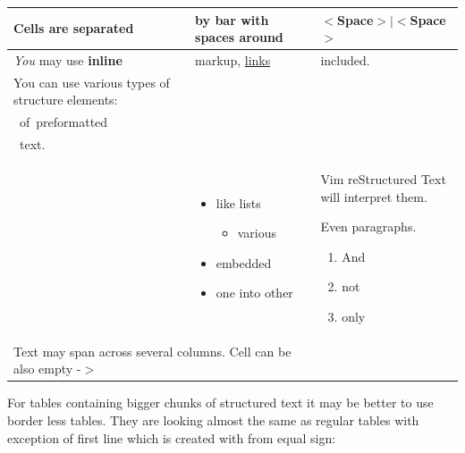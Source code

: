 \documentclass[12pt]{article}
\begin{document}
\setlongtables
\begin{center}
\begin{longtable}[c]{|p{}|p{}|p{}|}\hline

Cells are 
separated
&
by bar with 
spaces around
&
$<$Space$>$$|$$<$Space$>$
\\ \hline
\emph{You} may use 
\textbf{inline}
&
markup, 
\href{\#llinks}{links}
&
included.
\\ \hline
You can use various
types of structure 
elements:

\begin{ttfamily}\begin{flushleft}
\mbox{~Welcome~to~world~~}\\
\mbox{~of~preformatted~~~}\\
\mbox{~text.}\\
\end{flushleft}\end{ttfamily}
&
\begin{itemize}
\item
like lists

 \begin{itemize}
\item
various
\end{itemize}

\item
embedded

\item
one into 
other
\end{itemize}
&
Vim reStructured Text will 
interpret them.

Even paragraphs.

\begin{enumerate}[label=\arabic*.]
\item
And

\item
not

\item
only
\end{enumerate}

 \\ \hline
\multicolumn{2}{|p{0.60\textwidth}|}{Text may span across several 
columns. Cell can be also empty -$>$
}
&
\\ \hline\end{longtable}
\end{center}

For tables containing bigger chunks of structured text it may be better
to use border less tables. They are looking almost the same as regular
tables with exception of first line which is created with from equal
sign:
\end{document}
